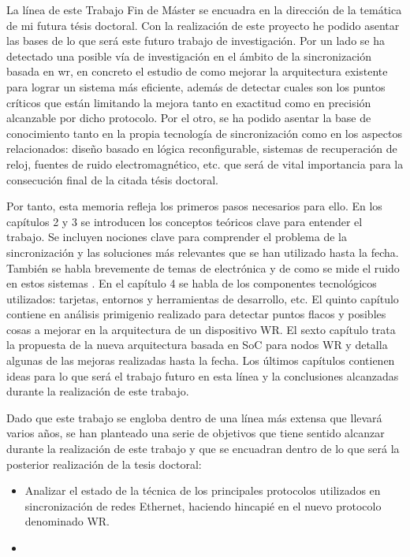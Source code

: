 La línea de este Trabajo Fin de Máster se encuadra en la dirección de la 
temática de mi futura tésis doctoral. Con la realización de este proyecto he 
podido asentar las bases de lo que será este futuro trabajo de investigación. 
Por un lado se ha detectado una posible vía de investigación en el ámbito de la 
sincronización basada en \gls{wr}, en concreto el estudio de como mejorar la 
arquitectura existente para lograr un sistema más eficiente, además de detectar 
cuales son los puntos críticos que están limitando la mejora tanto en exactitud 
como en precisión alcanzable por dicho protocolo. Por el otro, se ha podido 
asentar la base de conocimiento tanto en la propia tecnología de sincronización 
como en los aspectos relacionados: diseño basado en lógica reconfigurable, 
sistemas de recuperación de reloj, fuentes de ruido electromagnético, etc. que 
será de vital importancia para la consecución final de la citada tésis doctoral.

Por tanto, esta memoria refleja los primeros pasos necesarios para ello. En los 
capítulos 2 y 3 se introducen los conceptos teóricos clave para entender el 
trabajo. Se incluyen nociones clave para comprender el problema de la 
sincronización y las soluciones más relevantes que se han utilizado hasta la 
fecha. También se habla brevemente de temas de electrónica y de como se mide el 
ruido en estos sistemas . En el capítulo 4 se habla de 
los componentes tecnológicos utilizados: tarjetas, entornos y herramientas de 
desarrollo, etc. El quinto capítulo contiene en análisis primigenio realizado 
para detectar puntos flacos y posibles cosas a mejorar en la arquitectura de un 
dispositivo \gls{WR}. El sexto capítulo trata la propuesta de la nueva 
arquitectura basada en \gls{SoC} para nodos \gls{WR} y detalla algunas de las 
mejoras realizadas hasta la fecha. Los últimos capítulos contienen ideas para 
lo que será el trabajo futuro en esta línea y la conclusiones alcanzadas 
durante la realización de este trabajo.

Dado que este trabajo se engloba dentro de una línea más extensa que llevará 
varios años, se han planteado una serie de objetivos que tiene sentido alcanzar 
durante la realización de este trabajo y que se encuadran dentro de lo que será 
la posterior realización de la tesis doctoral:

\begin{itemize}
	\item Analizar el estado de la técnica de los principales protocolos 
	utilizados en sincronización de redes Ethernet, haciendo hincapié en el 
	nuevo protocolo denominado \gls{WR}.
	
	\item 
\end{itemize}


